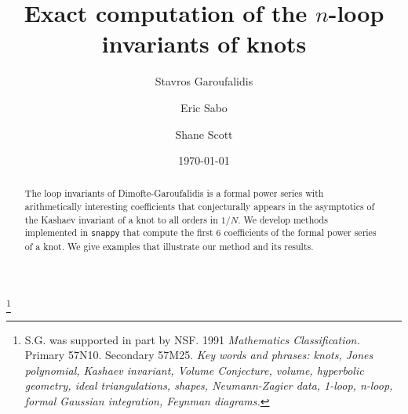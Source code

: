 \documentclass[12pt]{amsart}
\theoremstyle{definition}
\begin{document}

\title[Exact computation of the $n$-loop invariants of knots]{
Exact computation of the $n$-loop invariants of knots}

\author{Stavros Garoufalidis}
\address{School of Mathematics \\
         Georgia Institute of Technology \\
         Atlanta, GA 30332-0160, USA \newline
         {\tt \url{http://www.math.gatech.edu/~stavros }}}
\author{Eric Sabo}
\address{School of Mathematics \\
         Georgia Institute of Technology \\
         Atlanta, GA 30332-0160, USA \newline
         {\tt \url{http://www.math.gatech.edu/users/esabo3 }}}
\author{Shane Scott}
\address{School of Mathematics \\
         Georgia Institute of Technology \\
         Atlanta, GA 30332-0160, USA \newline
         {\tt \url{http://www.math.gatech.edu/users/sscott42 }}}
\thanks{
S.G. was supported in part by NSF.
1991 {\em Mathematics Classification.} Primary 57N10. Secondary 57M25.
\newline
{\em Key words and phrases: knots, Jones polynomial, Kashaev invariant,
Volume Conjecture, volume, hyperbolic geometry, ideal triangulations,
shapes, Neumann-Zagier data, 1-loop, n-loop, formal Gaussian integration,
Feynman diagrams.}
}

\date{\today}


\begin{abstract}
The loop invariants of Dimofte-Garoufalidis is a formal power series with
arithmetically interesting coefficients that conjecturally appears
in the asymptotics of the Kashaev invariant of a knot to all orders in $1/N$.
We develop methods implemented in {\tt snappy} that compute the first 6 
coefficients of the formal power series of a knot. We give examples that
illustrate our method and its results.
\end{abstract}

\maketitle
\end{document}
